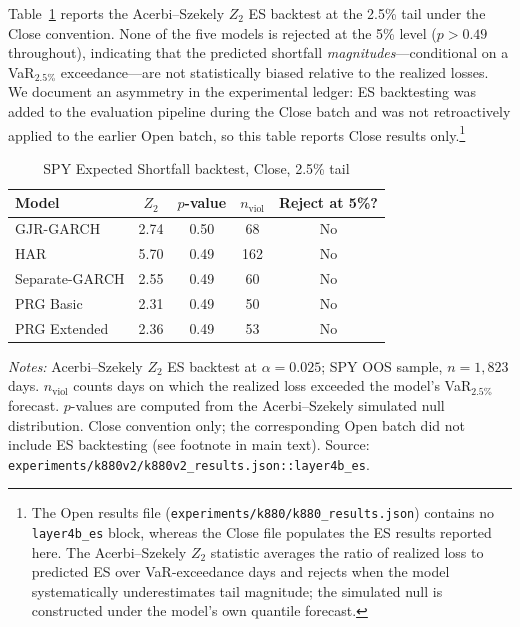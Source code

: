 \documentclass[11pt,a4paper]{article}
\begin{document}
Table~\ref{app:tab:es_k880v2} reports the Acerbi--Szekely
\citeyearpar{Acerbi2014} $Z_2$ ES backtest at the 2.5\% tail under the
Close convention. None of the five models is rejected at the 5\% level
($p > 0.49$ throughout), indicating that the predicted shortfall
\emph{magnitudes}---conditional on a VaR$_{2.5\%}$ exceedance---are not
statistically biased relative to the realized losses. We document an
asymmetry in the experimental ledger: ES backtesting was added to the
evaluation pipeline during the Close batch and was not retroactively
applied to the earlier Open batch, so this table reports Close results
only.\footnote{The Open results file (\texttt{experiments/k880/k880\_results.json})
contains no \texttt{layer4b\_es} block, whereas the Close file
populates the ES results reported here. The Acerbi--Szekely $Z_2$
statistic averages the ratio of realized loss to predicted ES over
VaR-exceedance days and rejects when the model systematically
underestimates tail magnitude; the simulated null is constructed under
the model's own quantile forecast.}

\begin{table}[htbp]
\centering
\caption{SPY Expected Shortfall backtest, Close, 2.5\% tail}
\label{app:tab:es_k880v2}
\small
\begin{tabular}{lcccc}
\toprule
Model & $Z_2$ & $p$-value & $n_{\text{viol}}$ & Reject at 5\%? \\
\midrule
GJR-GARCH      & 2.74 & 0.50 & 68  & No \\
HAR            & 5.70 & 0.49 & 162 & No \\
Separate-GARCH & 2.55 & 0.49 & 60  & No \\
PRG Basic      & 2.31 & 0.49 & 50  & No \\
PRG Extended   & 2.36 & 0.49 & 53  & No \\
\bottomrule
\end{tabular}
\begin{flushleft}
\footnotesize
\emph{Notes:} Acerbi--Szekely $Z_2$ ES backtest at $\alpha = 0.025$;
SPY OOS sample, $n = 1{,}823$ days. $n_{\text{viol}}$ counts days on
which the realized loss exceeded the model's VaR$_{2.5\%}$ forecast.
$p$-values are computed from the Acerbi--Szekely simulated null
distribution. Close convention only; the corresponding Open batch did
not include ES backtesting (see footnote in main text).
Source: \texttt{experiments/k880v2/k880v2\_results.json::layer4b\_es}.
\end{flushleft}
\end{table}
\end{document}
